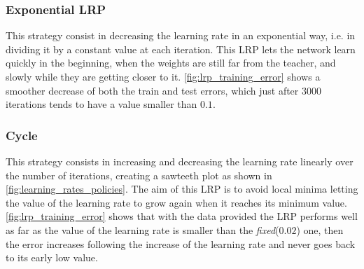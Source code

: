 \subsubsection{Exponential \ac{LRP}}
This strategy consist in decreasing the learning rate in an exponential way, i.e. in dividing it by a constant value at each iteration.
This \ac{LRP} lets the network learn quickly in the beginning, when the weights are still far from the teacher, and slowly while they are getting closer to it.
\cref{fig:lrp_training_error} shows a smoother decrease of both the train and test errors, which just after $3000$ iterations tends to have a value smaller than $0.1$.

\subsubsection{Cycle}
This strategy consists in increasing and decreasing the learning rate linearly over the number of iterations, creating a sawteeth plot as shown in \cref{fig:learning_rates_policies}.
The aim of this \ac{LRP} is to avoid local minima letting the value of the learning rate to grow again when it reaches its minimum value.
\cref{fig:lrp_training_error} shows that with the data provided the \ac{LRP} performs well as far as the value of the learning rate is smaller than the \textit{fixed}($0.02$) one, then the error increases following the increase of the learning rate and never goes back to its early low value.
